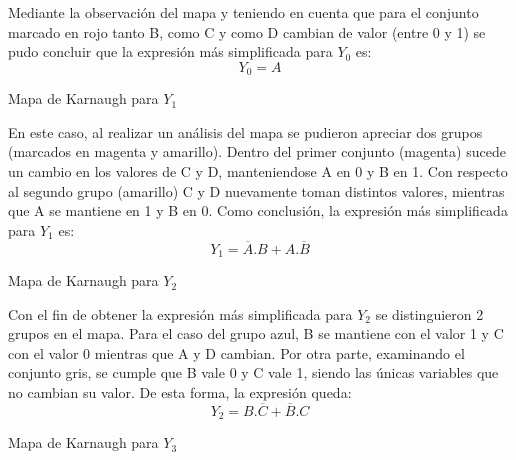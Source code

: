 \noindent
Mediante la observaci\'on del mapa y teniendo en cuenta que para el conjunto marcado en rojo tanto B, como C y como D cambian de valor (entre 0 y 1) se pudo concluir que la expresi\'on m\'as simplificada para $Y_0$ es:
\begin{equation}
    Y_0 = A
    \label{ecy0}
\end{equation}

\begin{center}
Mapa de Karnaugh para $Y_1$

\begin{Karnaugh4}
    \centering
\end{Karnaugh4}
\end{center}

\noindent
En este caso, al realizar un an\'alisis del mapa se pudieron apreciar dos grupos (marcados en magenta y amarillo). Dentro del primer conjunto (magenta) sucede un cambio en los valores de C y D, manteniendose A en 0 y B en 1. Con respecto al segundo grupo (amarillo) C y D nuevamente toman distintos valores, mientras que A se mantiene en 1 y B en 0. Como conclusi\'on, la expresi\'on m\'as simplificada para $Y_1$ es: 
\begin{equation}
    Y_1 = \overline{A}.B
 + A.\overline{B}
 \label{ecy1}
\end{equation}

\begin{center}
Mapa de Karnaugh para $Y_2$

\begin{Karnaugh4}
    \centering
\end{Karnaugh4}
\end{center}

\noindent
Con el fin de obtener la expresi\'on m\'as simplificada para $Y_2$ se distinguieron 2 grupos en el mapa. Para el caso del grupo azul, B se mantiene con el valor 1 y C con el valor 0 mientras que A y D cambian. Por otra parte, examinando el conjunto gris, se cumple que B vale 0 y C vale 1, siendo las \'unicas variables que no cambian su valor. De esta forma, la expresi\'on queda:
\begin{equation}
    Y_2 = B.\overline{C}
 + \overline{B}.C
 \label{ecy2}
\end{equation}
\begin{center}
Mapa de Karnaugh para $Y_3$

\begin{Karnaugh4}
    \centering
\end{Karnaugh4}
\end{center}

